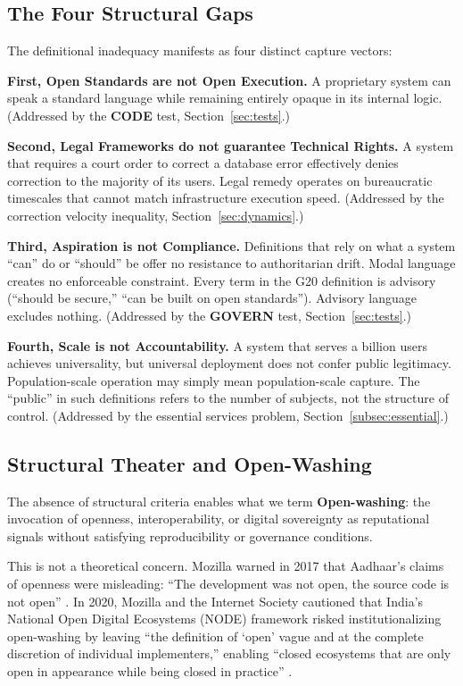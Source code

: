 \documentclass{article}
\begin{document}
\subsection{The Four Structural Gaps}

The definitional inadequacy manifests as four distinct capture vectors:

\textbf{First, Open Standards are not Open Execution.} A proprietary system can speak a standard language while remaining entirely opaque in its internal logic. (Addressed by the \textbf{CODE} test, Section~\ref{sec:tests}.)

\textbf{Second, Legal Frameworks do not guarantee Technical Rights.} A system that requires a court order to correct a database error effectively denies correction to the majority of its users. Legal remedy operates on bureaucratic timescales that cannot match infrastructure execution speed. (Addressed by the correction velocity inequality, Section~\ref{sec:dynamics}.)

\textbf{Third, Aspiration is not Compliance.} Definitions that rely on what a system ``can'' do or ``should'' be offer no resistance to authoritarian drift. Modal language creates no enforceable constraint. Every term in the G20 definition is advisory (``should be secure,'' ``can be built on open standards''). Advisory language excludes nothing. (Addressed by the \textbf{GOVERN} test, Section~\ref{sec:tests}.)

\textbf{Fourth, Scale is not Accountability.} A system that serves a billion users achieves universality, but universal deployment does not confer public legitimacy. Population-scale operation may simply mean population-scale capture. The ``public'' in such definitions refers to the number of subjects, not the structure of control. (Addressed by the essential services problem, Section~\ref{subsec:essential}.)

\subsection{Structural Theater and Open-Washing}
\label{subsec:openwashing-intro}

The absence of structural criteria enables what we term \textbf{Open-washing}: the invocation of openness, interoperability, or digital sovereignty as reputational signals without satisfying reproducibility or governance conditions.

This is not a theoretical concern. Mozilla warned in 2017 that Aadhaar's claims of openness were misleading: ``The development was not open, the source code is not open'' \citep{mozilla2017}. In 2020, Mozilla and the Internet Society cautioned that India's National Open Digital Ecosystems (NODE) framework risked institutionalizing open-washing by leaving ``the definition of `open' vague and at the complete discretion of individual implementers,'' enabling ``closed ecosystems that are only open in appearance while being closed in practice'' \citep{mozilla2020}.
\end{document}
